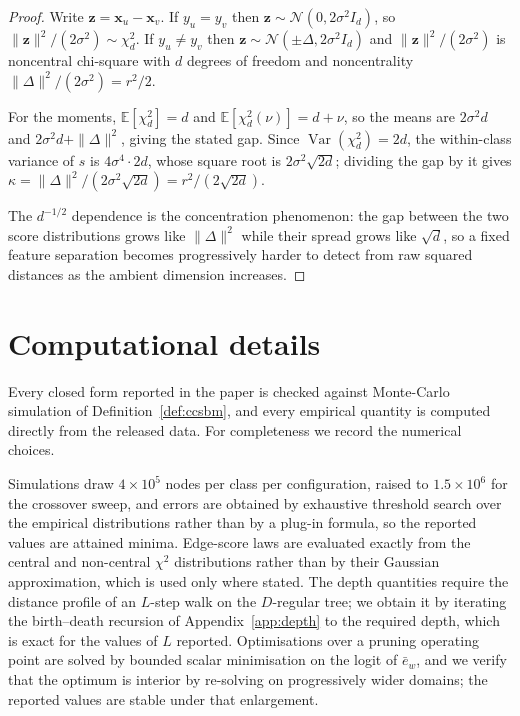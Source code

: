 \documentclass[../elsevier.tex]{subfiles}
\begin{document}
\begin{proof}
Write $\mathbf{z} = \mathbf{x}_u - \mathbf{x}_v$. If $y_u = y_v$ then
$\mathbf{z} \sim \mathcal{N}(0, 2\sigma^2 I_d)$, so
$\|\mathbf{z}\|^2/(2\sigma^2) \sim \chi^2_d$. If $y_u \neq y_v$ then
$\mathbf{z} \sim \mathcal{N}(\pm\Delta, 2\sigma^2 I_d)$ and
$\|\mathbf{z}\|^2/(2\sigma^2)$ is noncentral chi-square with $d$ degrees of freedom
and noncentrality $\|\Delta\|^2/(2\sigma^2) = r^2/2$.

For the moments, $\mathbb{E}[\chi^2_d] = d$ and
$\mathbb{E}[\chi^2_d(\nu)] = d + \nu$, so the means are $2\sigma^2 d$ and
$2\sigma^2 d + \|\Delta\|^2$, giving the stated gap. Since
$\operatorname{Var}(\chi^2_d) = 2d$, the within-class variance of $s$ is
$4\sigma^4\cdot 2d$, whose square root is $2\sigma^2\sqrt{2d}$; dividing the gap by
it gives $\kappa = \|\Delta\|^2/(2\sigma^2\sqrt{2d}) = r^2/(2\sqrt{2d})$.

The $d^{-1/2}$ dependence is the concentration phenomenon: the gap between the two
score distributions grows like $\|\Delta\|^2$ while their spread grows like
$\sqrt{d}$, so a fixed feature separation becomes progressively harder to detect
from raw squared distances as the ambient dimension increases.
\end{proof}

\section{Computational details}
\label{app:repro}

Every closed form reported in the paper is checked against Monte-Carlo simulation of
Definition~\ref{def:ccsbm}, and every empirical quantity is computed directly from the
released data. For completeness we record the numerical choices.

Simulations draw $4\times10^{5}$ nodes per class per configuration, raised to
$1.5\times10^{6}$ for the crossover sweep, and errors are obtained by exhaustive
threshold search over the empirical distributions rather than by a plug-in formula, so
the reported values are attained minima. Edge-score laws are evaluated exactly from the
central and non-central $\chi^2$ distributions rather than by their Gaussian
approximation, which is used only where stated. The depth quantities require the
distance profile of an $L$-step walk on the $D$-regular tree; we obtain it by iterating
the birth--death recursion of Appendix~\ref{app:depth} to the required depth, which is
exact for the values of $L$ reported. Optimisations over a pruning operating point are
solved by bounded scalar minimisation on the logit of $\bar e_w$, and we verify that the
optimum is interior by re-solving on progressively wider domains; the reported values
are stable under that enlargement.
\end{document}
